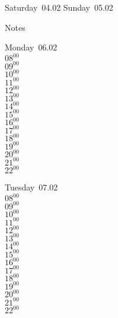 \documentclass[11pt,a4paper]{book}\usepackage[]{graphicx}\usepackage[]{color}
\begin{document}
\begin{weekendbox}
  Saturday~04.02
  \tcblower
  Sunday~05.02
\end{weekendbox} %
\begin{notebox}
  Notes
\end{notebox}
\clearpage
\begin{headerbox}
\end{headerbox}
\begin{weekdaybox}
  Monday~06.02\\
  { 
  \vfill
  $08^{00}$\\
$09^{00}$\\
$10^{00}$\\
$11^{00}$\\
$12^{00}$\\
$13^{00}$\\
$14^{00}$\\
$15^{00}$\\
$16^{00}$\\
$17^{00}$\\
$18^{00}$\\
$19^{00}$\\
$20^{00}$\\
$21^{00}$\\
$22^{00}$\\
  }
\end{weekdaybox}
\begin{weekdaybox}
  Tuesday~07.02\\
  { 
  \vfill
  $08^{00}$\\
$09^{00}$\\
$10^{00}$\\
$11^{00}$\\
$12^{00}$\\
$13^{00}$\\
$14^{00}$\\
$15^{00}$\\
$16^{00}$\\
$17^{00}$\\
$18^{00}$\\
$19^{00}$\\
$20^{00}$\\
$21^{00}$\\
$22^{00}$\\
  }
\end{weekdaybox}
\end{document}
